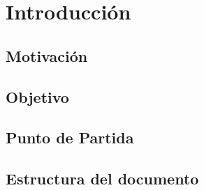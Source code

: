 \section{Introducción}

\subsection{Motivación}
\cite{lamport94}

\subsection{Objetivo}


\subsection{Punto de Partida}


\subsection{Estructura del documento}

\newpage



